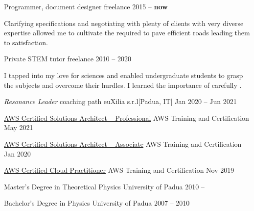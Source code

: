 \documentclass[9pt]{scrartcl}
\def\Phi{1.618}
\newlength{\Pad}\setlength{\Pad}{14.562pt} %
\begin{document}
\Event
  {Programmer, document designer}
  {freelance}
  {2015 -- \textbf{now}}

Clarifying specifications and negotiating with plenty of clients with very
diverse expertise allowed me to cultivate the  required to
pave efficient roads leading them to satisfaction.

\Event
  {Private STEM tutor}
  {freelance}
  {2010 -- 2020}

I tapped into my love for sciences and enabled undergraduate students to grasp
the subjects and overcome their hurdles. I learned the importance of carefully
.



\SimpleEvent
  {\emph{Resonance Leader} coaching path}
  {euXilia s.r.l}[Padua, IT]
  {Jan 2020 -- Jun 2021}

\SimpleEvent
  {\href{https://www.credly.com/badges/37aaaf27-3a2e-436d-9195-db4f46eb222e/public_url}
  {%
   AWS Certified Solutions Architect -- Professional}}
  {AWS Training and Certification}
  {May 2021}

\SimpleEvent
  {\href{https://www.credly.com/badges/d092afab-f194-4074-ade6-78728c854faa/public_url}
  {%
   AWS Certified Solutions Architect -- Associate}}
  {AWS Training and Certification}
  {Jan 2020}

\SimpleEvent
  {\href{https://www.credly.com/badges/d268e963-65ba-462b-a835-f65a7baccccd/public_url}
  {%
   AWS Certified Cloud Practitioner}}
  {AWS Training and Certification}
  {Nov 2019}

\SimpleEvent
  {Master's Degree in Theoretical Physics}
  {University of Padua}
  {2010 -- }

\SimpleEvent
  {Bachelor's Degree in Physics}
  {University of Padua}
  {2007 -- 2010}
\end{document}
